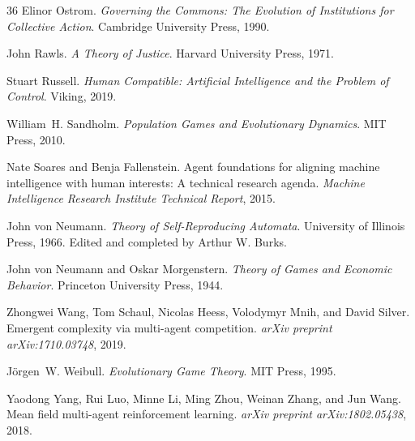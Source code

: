\documentclass[12pt]{article}
\begin{document}
\begin{thebibliography}{36}
Elinor Ostrom.
\newblock \emph{Governing the Commons: The Evolution of Institutions for
  Collective Action}.
\newblock Cambridge University Press, 1990.

John Rawls.
\newblock \emph{A Theory of Justice}.
\newblock Harvard University Press, 1971.

Stuart Russell.
\newblock \emph{Human Compatible: Artificial Intelligence and the Problem of
  Control}.
\newblock Viking, 2019.

William~H. Sandholm.
\newblock \emph{Population Games and Evolutionary Dynamics}.
\newblock MIT Press, 2010.

Nate Soares and Benja Fallenstein.
\newblock Agent foundations for aligning machine intelligence with human
  interests: A technical research agenda.
\newblock \emph{Machine Intelligence Research Institute Technical Report},
  2015.

John von Neumann.
\newblock \emph{Theory of Self-Reproducing Automata}.
\newblock University of Illinois Press, 1966.
\newblock Edited and completed by Arthur W. Burks.

John von Neumann and Oskar Morgenstern.
\newblock \emph{Theory of Games and Economic Behavior}.
\newblock Princeton University Press, 1944.

Zhongwei Wang, Tom Schaul, Nicolas Heess, Volodymyr Mnih, and David Silver.
\newblock Emergent complexity via multi-agent competition.
\newblock \emph{arXiv preprint arXiv:1710.03748}, 2019.

J{\"o}rgen~W. Weibull.
\newblock \emph{Evolutionary Game Theory}.
\newblock MIT Press, 1995.

Yaodong Yang, Rui Luo, Minne Li, Ming Zhou, Weinan Zhang, and Jun Wang.
\newblock Mean field multi-agent reinforcement learning.
\newblock \emph{arXiv preprint arXiv:1802.05438}, 2018.

\end{thebibliography}

\end{document}
